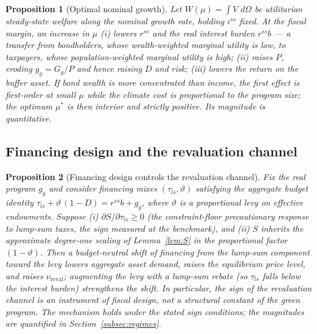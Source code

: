 \documentclass[12pt]{article}
\newtheorem{proposition}{Proposition}
\newcommand{\Sfun}{S}
\newcommand{\dd}{\,d}
\begin{document}
\begin{proposition}[Optimal nominal growth]\label{prop:optimalmu}
Let $W(\mu)=\int V\,\dd\Omega$ be utilitarian steady-state welfare along the
nominal growth rate, holding $i^{ss}$ fixed. At the fiscal margin, an increase
in $\mu$ (i) lowers $r^{ss}$ and the real interest burden $r^{ss}b$ --- a
transfer from bondholders, whose wealth-weighted marginal utility is low, to
taxpayers, whose population-weighted marginal utility is high; (ii) raises
$P$, eroding $g_g=G_g/P$ and hence raising $D$ and risk; (iii) lowers the
return on the buffer asset. If bond wealth is more concentrated than income,
the first effect is first-order at small $\mu$ while the climate cost is
proportional to the program size; the optimum $\mu^{*}$ is then interior and
strictly positive. Its magnitude is quantitative.
\end{proposition}

\subsection{Financing design and the revaluation channel}\label{subsec:financingdesign}

\begin{proposition}[Financing design controls the revaluation channel]
\label{prop:financingdesign}
Fix the real program $g_g$ and consider financing mixes
$(\tau_{ls}, \vartheta)$ satisfying the aggregate budget identity
$\tau_{ls} + \vartheta\,(1-D) = r^{ss} b + g_g$, where $\vartheta$ is a
proportional levy on effective endowments. Suppose (i)
$\partial \Sfun/\partial \tau_{ls} \ge 0$ (the constraint-floor
precautionary response to lump-sum taxes, the sign measured at the
benchmark), and (ii) $\Sfun$ inherits the approximate degree-one scaling of
Lemma~\ref{lem:S} in the proportional factor $(1-\vartheta)$. Then a
budget-neutral shift of financing from the lump-sum component toward the
levy lowers aggregate asset demand, raises the equilibrium price level, and
raises $\nu_{\mathrm{reval}}$; augmenting the levy with a lump-sum rebate
(so $\tau_{ls}$ falls below the interest burden) strengthens the shift. In
particular, the sign of the revaluation channel is an instrument of fiscal
design, not a structural constant of the green program. The mechanism holds
under the stated sign conditions; the magnitudes are quantified in
Section~\ref{subsec:regimes}.
\end{proposition}
\end{document}
